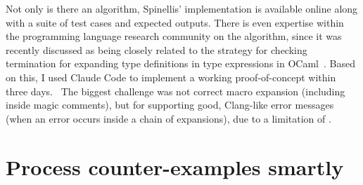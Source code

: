 Not only is there an algorithm, Spinellis' implementation is available
online
along with a suite of test
cases
and expected
outputs.
There is even expertise within the programming language research community on
the algorithm, since it was recently discussed as being closely related to the
strategy for checking termination for expanding type definitions in type
expressions in OCaml~. Based on this, I used
Claude Code to implement a working proof-of-concept within three
days.~
The biggest challenge was not correct macro expansion (including inside magic
comments), but for supporting good, Clang-like error messages (when an
error occurs inside a chain of expansions), due to a limitation of .

\section{Process counter-examples smartly}\label{sec:counter-ex}

